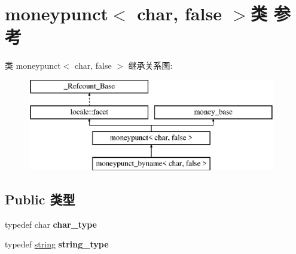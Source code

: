 \hypertarget{classmoneypunct_3_01char_00_01false_01_4}{}\section{moneypunct$<$ char, false $>$类 参考}
\label{classmoneypunct_3_01char_00_01false_01_4}
类 moneypunct$<$ char, false $>$ 继承关系图\+:\begin{figure}[H]
\begin{center}
\leavevmode
\includegraphics[height=4.000000cm]{classmoneypunct_3_01char_00_01false_01_4}
\end{center}
\end{figure}
\subsection*{Public 类型}
\begin{DoxyCompactItemize}
\item 
\mbox{\label{classmoneypunct_3_01char_00_01false_01_4_ac40a9347db21285b8967ed81062e6a7c}} 
typedef char {\bfseries char\+\_\+type}
\item 
\mbox{\label{classmoneypunct_3_01char_00_01false_01_4_ae47809f12ab60f7d01c62c17a72589b9}} 
typedef \hyperlink{structstring}{string} {\bfseries string\+\_\+type}
\end{DoxyCompactItemize}
